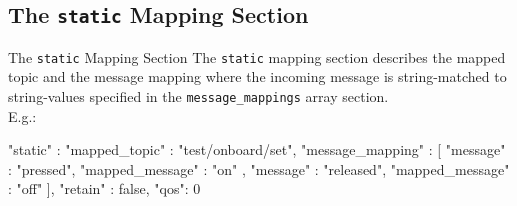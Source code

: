 ﻿\subsection{The \alert{\texttt{static}} Mapping Section}

\begin{frame}[fragile]{The \alert{\texttt{static}} Mapping Section}
  The \textcolor{fh-ooe-red}{\texttt{static}} mapping section describes the mapped topic and the message mapping where the \textcolor{fh-ooe-red}{incoming message} is \textcolor{fh-ooe-red}{string-matched} to \textcolor{fh-ooe-red}{string-values} specified in the \texttt{\textcolor{fh-ooe-red}{message\_mappings}} array section.\\
  E.g.:

  \begin{jsoncode}[gobble=8]
        "static" : {
            "mapped_topic" : "test/onboard/set",
            "message_mapping" : [{
                "message" : "pressed",
                "mapped_message" : "on"
            },{
                "message" : "released",
                "mapped_message" : "off"
            }],
            "retain" : false,
            "qos": 0
        }
  \end{jsoncode}
\end{frame}

